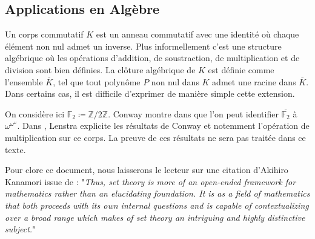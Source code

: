 \documentclass[french]{article}
\theoremstyle{definition}
\theoremstyle{plain}
\theoremstyle{plain}
\theoremstyle{plain}
\theoremstyle{plain}
\theoremstyle{plain}
\begin{document}
\clearpage
\subsection{Applications en Algèbre}

\par Un corps commutatif \( K \) est un anneau commutatif avec une identité où chaque élément non nul admet un inverse. Plus informellement c'est une structure algébrique où les opérations d'addition, de soustraction, de multiplication et de division sont bien définies. La clôture algébrique de \( K \) est définie comme l'ensemble \( \overline{K} \), tel que tout polynôme \( P \) non nul dans \( K \) admet une racine dans \( \overline{K} \). Dans certains cas, il est difficile d'exprimer de manière simple cette extension.

\par On considère ici \( \mathbb{F}_{2} \coloneqq \mathbb{Z}/2\mathbb{Z} \). Conway montre dans \cite{conway2000onag} que l'on peut identifier \( \overline{\mathbb{F}_{2}} \) à \(\omega^{\omega^\omega} \). Dans \cite{lenstra1977algebraic}, Lenstra explicite les résultats de Conway et notemment l'opération de multiplication sur ce corps. La preuve de ces résultats ne sera pas traitée dans ce texte. \\
\par Pour clore ce document, nous laisserons le lecteur sur une citation d’Akihiro Kanamori issue de \cite{kanamori2009set} : "\textit{Thus, set theory is more of an open-ended framework for mathematics rather than an elucidating foundation. It is as a field of mathematics that both proceeds with its own internal questions and is capable of contextualizing over a broad range which makes of set theory an intriguing and highly distinctive subject.}"
	
\clearpage
\printbibliography[heading=bibintoc]
\end{document}
